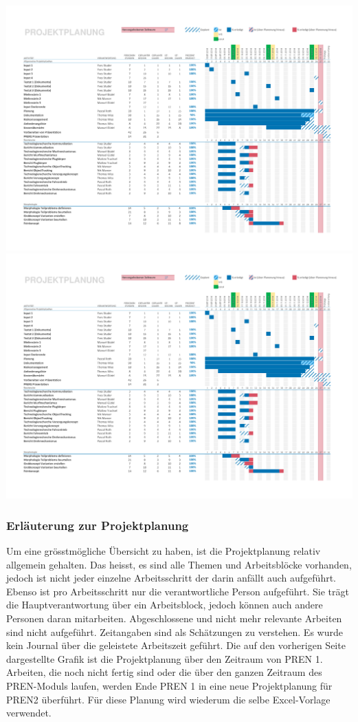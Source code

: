 \begin{landscape}
    \includegraphics[page=1,scale=0.85,clip,trim=15mm 22mm 13mm 18mm] {Enddokumentation/Projektplanung_Management/Bilder/Projekt-Planung_Team32.pdf}
    \newpage
    \includegraphics[page=2,scale=0.85,clip,trim=15mm 100mm 13mm 10mm] {Enddokumentation/Projektplanung_Management/Bilder/Projekt-Planung_Team32.pdf}
    \newpage
\end{landscape}
\subsubsection{Erläuterung zur Projektplanung}
Um eine grösstmögliche Übersicht zu haben, ist die Projektplanung relativ 
allgemein gehalten. Das heisst, es sind alle Themen und Arbeitsblöcke vorhanden, 
jedoch ist nicht jeder einzelne Arbeitsschritt der darin anfällt auch aufgeführt. 
Ebenso ist pro Arbeitsschritt nur die verantwortliche Person aufgeführt. Sie 
trägt die Hauptverantwortung über ein Arbeitsblock, jedoch können auch andere 
Personen daran mitarbeiten. Abgeschlossene und nicht mehr relevante Arbeiten 
sind nicht aufgeführt. Zeitangaben sind als Schätzungen zu verstehen. Es wurde 
kein Journal über die geleistete Arbeitszeit geführt. Die auf den vorherigen 
Seite dargestellte Grafik ist die Projektplanung über den Zeitraum von PREN 1. 
Arbeiten, die noch nicht fertig sind oder die über den ganzen Zeitraum des 
PREN-Moduls laufen, werden Ende PREN 1 in eine neue Projektplanung für PREN2 
überführt. Für diese Planung wird wiederum die selbe Excel-Vorlage verwendet. 

